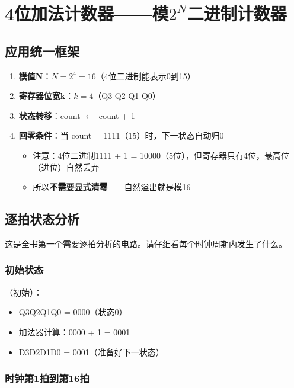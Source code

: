 \chapter{4位加法计数器——模$2^N$二进制计数器}

\section{应用统一框架}

\begin{enumerate}
  \item \textbf{模值N}：$N = 2^4 = 16$（4位二进制能表示0到15）
  \item \textbf{寄存器位宽k}：$k = 4$（Q3 Q2 Q1 Q0）
  \item \textbf{状态转移}：count $\leftarrow$ count + 1
  \item \textbf{回零条件}：当 count = 1111（15）时，下一状态自动归0
    \begin{itemize}
      \item 注意：4位二进制1111 + 1 = 10000（5位），但寄存器只有4位，最高位（进位）自然丢弃
      \item 所以\textbf{不需要显式清零}——自然溢出就是模16
    \end{itemize}
\end{enumerate}

\section{逐拍状态分析}

这是全书第一个需要逐拍分析的电路。请仔细看每个时钟周期内发生了什么。

\subsection{初始状态}

（初始）：
\begin{itemize}
  \item Q3Q2Q1Q0 = 0000（状态0）
  \item 加法器计算：0000 + 1 = 0001
  \item D3D2D1D0 = 0001（准备好下一状态）
\end{itemize}

\subsection{时钟第1拍到第16拍}

